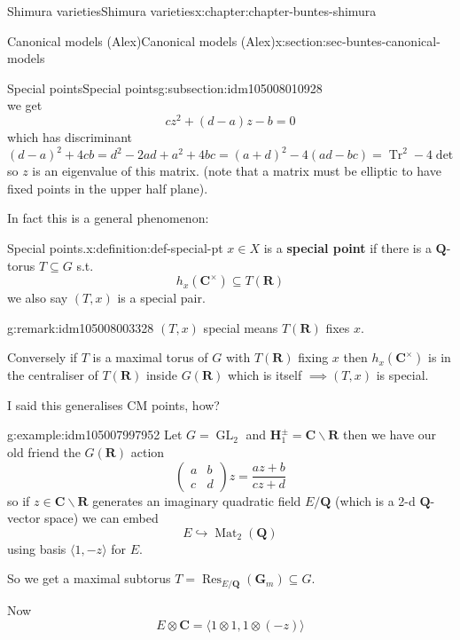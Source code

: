 \documentclass[oneside,10pt,]{book}
\newcommand{\terminology}[1]{\textbf{#1}}
\numberwithin{equation}{section}
\newcommand{\QQ}{\mathbf{Q}}
\newcommand{\RR}{\mathbf{R}}
\newcommand{\CC}{\mathbf{C}}
\DeclareMathOperator{\Res}{Res}
\DeclareMathOperator{\trace}{Tr}
\DeclareMathOperator{\Mat}{Mat}
\DeclareMathOperator{\GL}{GL}
\newcommand{\amp}{&}
\begin{document}
\begin{chapterptx}{Shimura varieties}{}{Shimura varieties}{}{}{x:chapter:chapter-buntes-shimura}
\begin{sectionptx}{Canonical models (Alex)}{}{Canonical models (Alex)}{}{}{x:section:sec-buntes-canonical-models}
\begin{subsectionptx}{Special points}{}{Special points}{}{}{g:subsection:idm105008010928}
\begin{equation*}
\end{equation*}
we get%
\begin{equation*}
cz^2 + (d - a) z - b = 0
\end{equation*}
which has discriminant \((d-a)^2 + 4cb = d^2 - 2ad + a^2 + 4bc =  (a+d)^2 - 4(ad - bc) = \trace^2 - 4\det\) so \(z\) is an eigenvalue of this matrix. (note that a matrix must be elliptic to have fixed points in the upper half plane).%
\par
In fact this is a general phenomenon:%
\begin{definition}{Special points.}{x:definition:def-special-pt}%
\(x \in X\) is a \terminology{special point} if there is a \(\QQ\)-torus \(T \subseteq G\) s.t.%
\begin{equation*}
h_x(\CC^\times) \subseteq T(\RR)
\end{equation*}
we also say \((T,x)\) is a special pair.%
\end{definition}
\begin{remark}{}{g:remark:idm105008003328}%
\((T,x)\) special means \(T(\RR)\) fixes \(x\).%
\par
Conversely if \(T\) is a maximal torus of \(G\) with \(T(\RR)\) fixing \(x\) then \(h_x(\CC^\times)\) is in the centraliser of \(T(\RR)\) inside \(G(\RR)\) which is itself \(\implies (T,x)\) is special.%
\end{remark}
I said this generalises CM points, how?%
\begin{example}{}{g:example:idm105007997952}%
Let \(G = \GL_2\) and \(\mathbf H_1^\pm = \CC \smallsetminus \RR\) then we have our old friend the \(G(\RR)\) action%
\begin{equation*}
\begin{pmatrix} a\amp b \\ c \amp d\end{pmatrix} z = \frac{az + b}{cz+d}
\end{equation*}
so if \(z \in \CC \smallsetminus \RR\) generates an imaginary quadratic field \(E/\QQ\) (which is a 2-d \(\QQ\)-vector space) we can embed%
\begin{equation*}
E \hookrightarrow \Mat_2(\QQ)
\end{equation*}
using basis \(\langle 1, -z\rangle\) for \(E\).%
\par
So we get a maximal subtorus \(T = \Res_{E/\QQ}(\mathbf G_m) \subseteq G\).%
\par
Now%
\begin{equation*}
E\otimes \CC = \langle 1\otimes 1, 1 \otimes (-z)\rangle
\end{equation*}

\end{example}
\end{subsectionptx}
\end{sectionptx}
\end{chapterptx}
\end{document}
